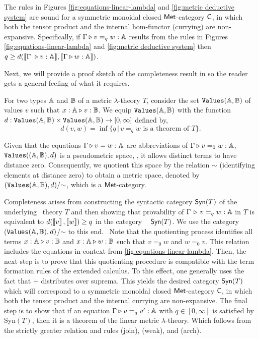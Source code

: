 \begin{theorem} [Soundness] \cite[Theorem 3.14]{dahlqvist2023syntactic}  \label{thm:soundness_metric_no_cond}
  The rules in Figures \ref{fig:equations-linear-lambda} and \ref{fig:metric deductive system} are sound for a  symmetric monoidal closed $\mathsf{Met}$-category  $\mathsf{C}$, in which both the tensor product and the internal hom-functor (currying) are non-expansive. Specifically, if $\Gamma \triangleright v =_{q} w : \mathbb{A} $ results from the rules in Figures \ref{fig:equations-linear-lambda} and \ref{fig:metric deductive system} then $q \geq d( \llbracket \Gamma  \vljud v : \typeA \rrbracket, \llbracket\Gamma \vljud w : \typeA \rrbracket)$.
\end{theorem}


Next, we will provide a proof sketch of the completeness result in \cite{dahlqvist2023syntactic} so the reader gets a general feeling of what it requires.

For two types $\mathbb{A}$ and $\mathbb{B}$ of a metric $\lambda$-theory $T$, consider the set $\texttt{Values}(\mathbb{A},\mathbb{B})$ of values $v$ such that $x : \mathbb{A} \triangleright v : \mathbb{B}$. We equip $\texttt{Values}(\mathbb{A},\mathbb{B})$ with the function $d :\texttt{Values}(\mathbb{A},\mathbb{B}) \times \texttt{Values}(\mathbb{A},\mathbb{B}) \rightarrow [0, \infty]$ defined by,
$$d(v,w)=\inf{\{q \, \vert \, v=_q w \text{ is a theorem of } T \}}.$$


Given that the equations $\Gamma \triangleright v = w : \mathbb{A}$ are abbreviations of $\Gamma \triangleright v =_0 w : \mathbb{A}$, $\texttt{Values}((\mathbb{A},\mathbb{B}), d)$ is a pseudometric space, \ie, it allows distinct terms to have distance zero. Consequently, we quotient this space by the relation $\sim$ (identifying elements at distance zero) to obtain a metric space, denoted by $(\texttt{Values}(\mathbb{A}, \mathbb{B}), d)/{\sim}$, which is a $\mathsf{Met}$-category.

Completeness arises from constructing the syntactic category $\mathsf{Syn}(T)$ of the underlying  theory
$T$ and then showing that provability of $\Gamma \, \triangleright \, v =_q w : \mathbb{A}$
 in $T$ is equivalent to $d(\left \llbracket v \right \rrbracket,\left \llbracket w \right \rrbracket) \geq q$ in the category
  $\mathsf{Syn}(T)$. We use the category (\texttt{Values}$(\mathbb{A},\mathbb{B}),d)$/$\sim$ to this end.  Note that the quotienting process identifies all terms $x : \mathbb{A} \triangleright v : \mathbb{B}$ and $x : \mathbb{A} \triangleright w : \mathbb{B}$ such that $v =_0 w$ and $w =_0 v$. This relation includes the equations-in-context from \autoref{fig:equations-linear-lambda}. Then, the next step is to prove that this quotienting procedure is compatible with the term formation rules of the extended calculus. To this effect, one generally uses the fact that $+$ distributes over suprema. This yields the desired category $\mathsf{Syn}(T)$ which will correspond to a symmetric monoidal closed $\mathsf{Met}$-category $\mathsf{C}$, in which both the tensor product and the internal currying are non-expansive. The final step is to show that if an equation $\Gamma \triangleright v =_q v' : \mathbb{A}$ with $q \in [0, \infty]$ is satisfied by Syn$(T)$, then it is a theorem of the linear metric $\lambda$-theory. Which follows from the strictly greater relation and rules (join), (weak), and (arch).




